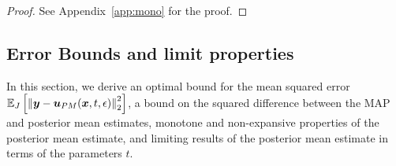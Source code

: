 \begin{proof}
See Appendix~\ref{app:mono} for the proof.
\end{proof}

\subsection{Error Bounds and limit properties} \label{subsec:prop_bounds-est}

In this section, we derive an optimal bound for the mean squared error $\mathbb{E}_{J}\left [{\left\Vert{\boldsymbol{y}-\boldsymbol{u}_{PM}(\boldsymbol{x},t,\epsilon)} \right\Vert_{2}^{2}}\right]$, a bound on the squared difference between the MAP and posterior mean estimates, monotone and non-expansive properties of the posterior mean estimate, and limiting results of the posterior mean estimate in terms of the parameters $t$.


